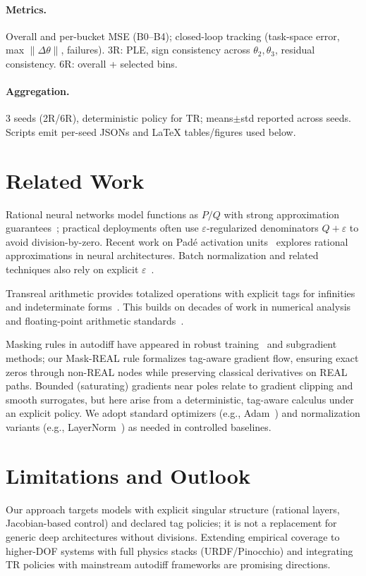 \documentclass[twoside,11pt]{article}
\newcommand{\trReal}{\textsc{REAL}}
\newcommand{\TAGREAL}{\trReal}
\begin{document}
\paragraph{Metrics.} Overall and per-bucket MSE (B0--B4); closed-loop tracking (task-space error, max $\|\Delta\theta\|$, failures). 3R: PLE, sign consistency across $\theta_2,\theta_3$, residual consistency. 6R: overall + selected bins.
\paragraph{Aggregation.} 3 seeds (2R/6R), deterministic policy for TR; means$\pm$std reported across seeds. Scripts emit per-seed JSONs and LaTeX tables/figures used below.

\section*{Related Work}
Rational neural networks model functions as $P/Q$ with strong approximation guarantees~\citep{boulle2020rational,telgarsky2017neural}; practical deployments often use $\varepsilon$-regularized denominators $Q+\varepsilon$ to avoid division-by-zero. Recent work on Padé activation units~\citep{montanher2020pade} explores rational approximations in neural architectures. Batch normalization and related techniques also rely on explicit $\varepsilon$~\citep{ioffe2015batchnorm}. 

Transreal arithmetic provides totalized operations with explicit tags for infinities and indeterminate forms~\citep{anderson2006perspex,reis2016transreal,reis2016transfields}. This builds on decades of work in numerical analysis~\citep{higham2002accuracy,muller2010handbook} and floating-point arithmetic standards~\citep{ieee754-2019,goldberg1991every}.

Masking rules in autodiff have appeared in robust training~\citep{pascanu2013difficulty} and subgradient methods; our Mask-REAL rule formalizes tag-aware gradient flow, ensuring exact zeros through non-\TAGREAL{} nodes while preserving classical derivatives on \TAGREAL{} paths. Bounded (saturating) gradients near poles relate to gradient clipping and smooth surrogates, but here arise from a deterministic, tag-aware calculus under an explicit policy. We adopt standard optimizers (e.g., Adam~\citep{kingma2015adam}) and normalization variants (e.g., LayerNorm~\citep{ba2016layernorm}) as needed in controlled baselines.

\section*{Limitations and Outlook}
Our approach targets models with explicit singular structure (rational layers, Jacobian-based control) and declared tag policies; it is not a replacement for generic deep architectures without divisions. Extending empirical coverage to higher-DOF systems with full physics stacks (URDF/Pinocchio) and integrating TR policies with mainstream autodiff frameworks are promising directions.
\end{document}
